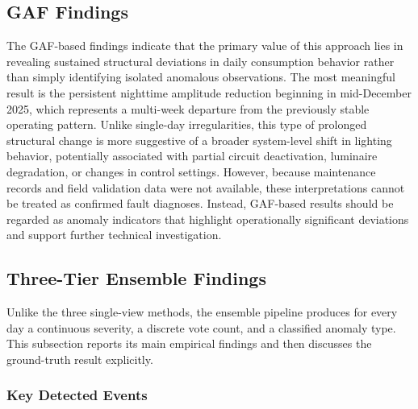 \documentclass{article}
\begin{document}
\subsection{ GAF Findings}

The GAF-based findings indicate that the primary value of this approach lies in revealing sustained structural deviations in daily consumption behavior rather than simply identifying isolated anomalous observations. The most meaningful result is the persistent nighttime amplitude reduction beginning in mid-December 2025, which represents a multi-week departure from the previously stable operating pattern. Unlike single-day irregularities, this type of prolonged structural change is more suggestive of a broader system-level shift in lighting behavior, potentially associated with partial circuit deactivation, luminaire degradation, or changes in control settings. However, because maintenance records and field validation data were not available, these interpretations cannot be treated as confirmed fault diagnoses. Instead, GAF-based results should be regarded as anomaly indicators that highlight operationally significant deviations and support further technical investigation.



\subsection{Three-Tier Ensemble Findings}

Unlike the three single-view methods, the ensemble pipeline produces for every day a continuous severity, a discrete vote count, and a classified anomaly type. This subsection reports its main empirical findings and then discusses the ground-truth result explicitly.

\subsubsection{Key Detected Events}
\end{document}
